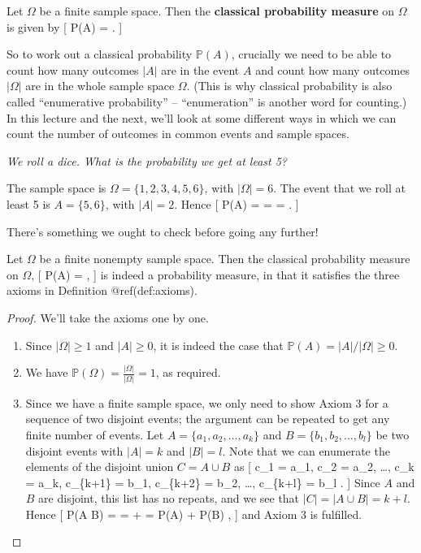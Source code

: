 \documentclass[
  letterpaper,
]{report}
\providecommand{\tightlist}{%
  \setlength{\itemsep}{0pt}\setlength{\parskip}{0pt}}\usepackage{longtable,booktabs,array}
\theoremstyle{definition}
\theoremstyle{definition}
\theoremstyle{remark}
\begin{document}
Let \(\Omega\) be a finite sample space. Then the \textbf{classical
probability measure} on \(\Omega\) is given by {[} \mathbb P(A) =
 . {]}

So to work out a classical probability \(\mathbb P(A)\), crucially we
need to be able to count how many outcomes \(|A|\) are in the event
\(A\) and count how many outcomes \(|\Omega|\) are in the whole sample
space \(\Omega\). (This is why classical probability is also called
``enumerative probability'' -- ``enumeration'' is another word for
counting.) In this lecture and the next, we'll look at some different
ways in which we can count the number of outcomes in common events and
sample spaces.

\emph{We roll a dice. What is the probability we get at least 5?}

The sample space is \(\Omega = \{1,2,3,4,5,6\}\), with \(|\Omega| = 6\).
The event that we roll at least 5 is \(A = \{5,6\}\), with \(|A| = 2\).
Hence {[} \mathbb P(A) =  =  =
 . {]}

There's something we ought to check before going any further!

Let \(\Omega\) be a finite nonempty sample space. Then the classical
probability measure on \(\Omega\), {[} \mathbb P(A) =
 , {]} is indeed a probability measure, in that it
satisfies the three axioms in Definition @ref(def:axioms).

\begin{proof}

We'll take the axioms one by one.

\begin{enumerate}
\def\labelenumi{\arabic{enumi}.}
\tightlist
\item
  Since \(|\Omega| \geq 1\) and \(|A| \geq 0\), it is indeed the case
  that \(\mathbb P(A) = |A|/|\Omega| \geq 0\).
\item
  We have
  \({\displaystyle \mathbb P(\Omega) = \frac{|\Omega|}{|\Omega|} = 1}\),
  as required.
\item
  Since we have a finite sample space, we only need to show Axiom 3 for
  a sequence of two disjoint events; the argument can be repeated to get
  any finite number of events. Let \(A = \{a_1, a_2, \dots, a_k\}\) and
  \(B = \{b_1, b_2, \dots, b_l\}\) be two disjoint events with
  \(|A| = k\) and \(|B| = l\). Note that we can enumerate the elements
  of the disjoint union \(C = A \cup B\) as {[} c\_1 = a\_1, c\_2 =
  a\_2, \dots, c\_k = a\_k, c\_\{k+1\} = b\_1, c\_\{k+2\} = b\_2, \dots,
  c\_\{k+l\} = b\_l . {]} Since \(A\) and \(B\) are disjoint, this list
  has no repeats, and we see that \(|C| = |A \cup B| = k+l\). Hence {[}
  \mathbb P(A \cup B) =  =  +
   = \mathbb P(A) + \mathbb P(B) , {]} and Axiom 3 is
  fulfilled.
\end{enumerate}

\end{proof}
\end{document}
